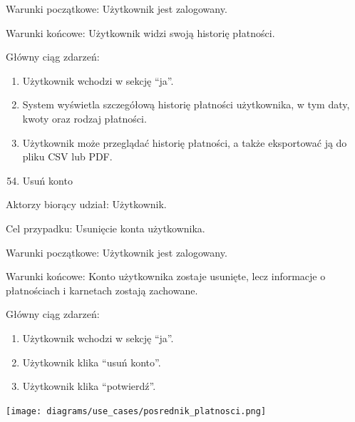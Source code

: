 \documentclass[
]{article}
\providecommand{\tightlist}{%
  \setlength{\itemsep}{0pt}\setlength{\parskip}{0pt}}
\begin{document}
{Warunki początkowe: Użytkownik jest zalogowany.}

{Warunki końcowe: Użytkownik widzi swoją historię płatności.}

{Główny ciąg zdarzeń:}

\begin{enumerate}
\tightlist
\item
  {Użytkownik wchodzi w sekcję ``ja''.}
\item
  {System wyświetla szczegółową historię płatności użytkownika, w tym
  daty, kwoty oraz rodzaj płatności.}
\item
  {Użytkownik może przeglądać historię płatności, a także eksportować ją
  do pliku CSV lub PDF.}
\end{enumerate}

{}

\begin{enumerate}
\setcounter{enumi}{53}
\tightlist
\item
  {Usuń konto}
\end{enumerate}

{Aktorzy biorący udział: Użytkownik.}

{Cel przypadku: Usunięcie konta użytkownika.}

{Warunki początkowe: Użytkownik jest zalogowany.}

{Warunki końcowe: Konto użytkownika zostaje usunięte, lecz informacje o
płatnościach i karnetach zostają zachowane.}

{Główny ciąg zdarzeń:}

\begin{enumerate}
\tightlist
\item
  {Użytkownik wchodzi w sekcję ``ja''.}
\item
  {Użytkownik klika ``usuń konto''.}
\item
  {Użytkownik klika ``potwierdź''.}
\end{enumerate}

\texttt{[image: diagrams/use\_cases/posrednik\_platnosci.png]}
\end{document}
